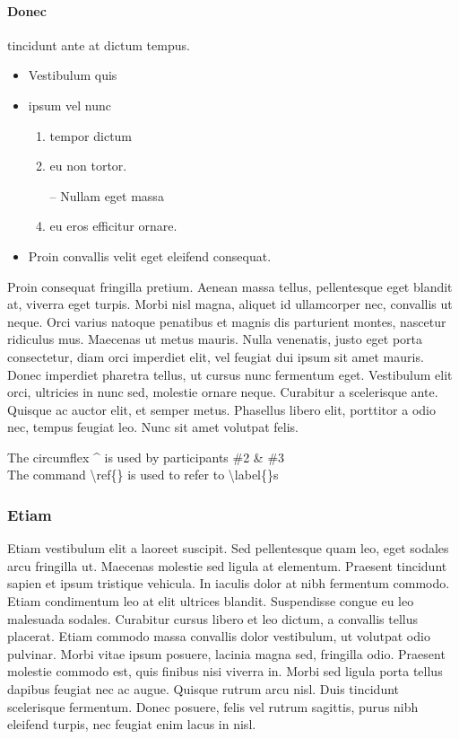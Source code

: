 \paragraph{Donec}
tincidunt ante at dictum tempus.

\begin{itemize}
 \item Vestibulum quis
 \item  ipsum vel nunc 
 \begin{enumerate}
  \item tempor dictum 
  \item eu non tortor. 
  \item[--] Nullam eget massa
  \item  eu eros efficitur ornare.
 \end{enumerate}
 \item  Proin convallis velit eget eleifend consequat.
\end{itemize}
Proin consequat fringilla pretium. Aenean massa tellus, pellentesque eget blandit at, viverra eget turpis. Morbi nisl magna, aliquet id ullamcorper nec, convallis ut neque. Orci varius natoque penatibus et magnis dis parturient montes, nascetur ridiculus mus. Maecenas ut metus mauris. Nulla venenatis, justo eget porta consectetur, diam orci imperdiet elit, vel feugiat dui ipsum sit amet mauris. Donec imperdiet pharetra tellus, ut cursus nunc fermentum eget. Vestibulum elit orci, ultricies in nunc sed, molestie ornare neque. Curabitur a scelerisque ante. Quisque ac auctor elit, et semper metus. Phasellus libero elit, porttitor a odio nec, tempus feugiat leo. Nunc sit amet volutpat felis. 


The circumflex \^{} is used by participants \#2 \& \#3\\
The command {\textbackslash}ref\{\} is used to refer to {\textbackslash}label\{\}s



\subsubsection{Etiam}
 Etiam vestibulum elit a laoreet suscipit. Sed pellentesque quam leo, eget sodales arcu fringilla ut. Maecenas molestie sed ligula at elementum. Praesent tincidunt sapien et ipsum tristique vehicula. In iaculis dolor at nibh fermentum commodo. Etiam condimentum leo at elit ultrices blandit. Suspendisse congue eu leo malesuada sodales. Curabitur cursus libero et leo dictum, a convallis tellus placerat. Etiam commodo massa convallis dolor vestibulum, ut volutpat odio pulvinar. Morbi vitae ipsum posuere, lacinia magna sed, fringilla odio. Praesent molestie commodo est, quis finibus nisi viverra in. Morbi sed ligula porta tellus dapibus feugiat nec ac augue. Quisque rutrum arcu nisl. Duis tincidunt scelerisque fermentum. Donec posuere, felis vel rutrum sagittis, purus nibh eleifend turpis, nec feugiat enim lacus in nisl. 
 
